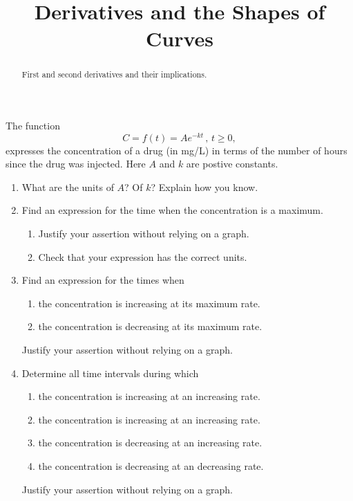 \documentclass{ximera}
\title{Derivatives and the Shapes of Curves}
\begin{document}
\begin{abstract}
First and second derivatives and their implications.
\end{abstract}
\maketitle


\begin{question}  \label{Q56hnnhfgh}
The function
\[
      C = f(t) = A e^{-kt} \, , \, t\geq 0 ,
\]
expresses the concentration of a drug (in mg/L) in terms of the number of hours since the drug was injected. Here $A$ and $k$ are postive constants.

\begin{enumerate}
\item What are the units of $A$? Of $k$? Explain how you know.



\item Find an expression for the time when the concentration is a maximum.

\begin{enumerate}
\item Justify your assertion without relying on a graph.

\item Check that your expression has the correct units.
\end{enumerate}

\item Find an expression for the times when
\begin{enumerate}
\item the concentration is increasing at its maximum rate.

\item the concentration is decreasing at its maximum rate.

\end{enumerate}
Justify your assertion without relying on a graph.


\item Determine all time intervals during which 

\begin{enumerate}
\item the concentration is increasing at an increasing rate.

\item the concentration is increasing at an increasing rate.

\item the concentration is decreasing at an increasing rate.

\item the concentration is decreasing at an decreasing rate.

\end{enumerate}
Justify your assertion without relying on a graph.




\end{enumerate}


\end{question}
\end{document}
